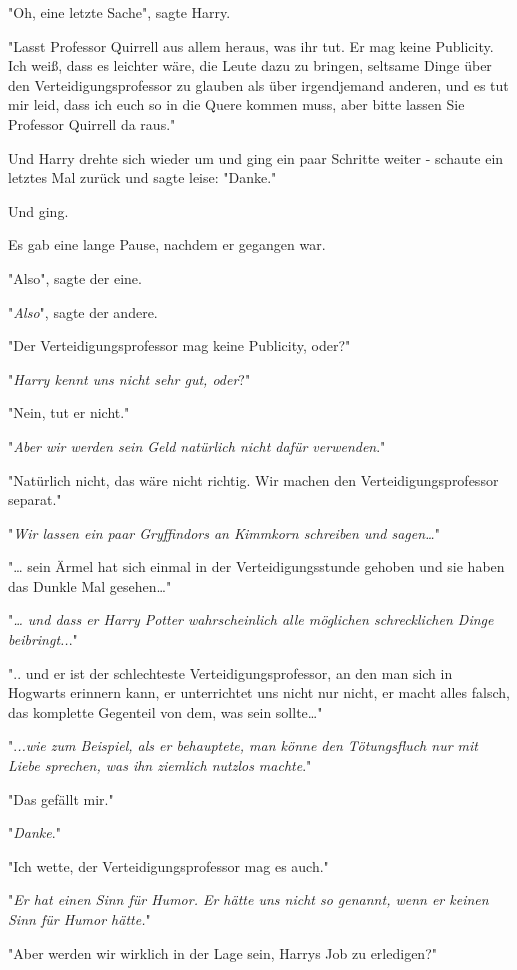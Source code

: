 {"Oh, eine letzte Sache", sagte Harry.

"Lasst Professor Quirrell aus allem heraus, was ihr tut. Er mag keine Publicity. Ich weiß, dass es leichter wäre, die Leute dazu zu bringen, seltsame Dinge über den Verteidigungsprofessor zu glauben als über irgendjemand anderen, und es tut mir leid, dass ich euch so in die Quere kommen muss, aber bitte lassen Sie Professor Quirrell da raus."

Und Harry drehte sich wieder um und ging ein paar Schritte weiter - schaute ein letztes Mal zurück und sagte leise: "Danke."

Und ging.

Es gab eine lange Pause, nachdem er gegangen war.

"Also", sagte der eine.

"\emph{Also}", sagte der andere.

"Der Verteidigungsprofessor mag keine Publicity, oder?"

"\emph{Harry kennt uns nicht sehr gut, oder}?"

"Nein, tut er nicht."

"\emph{Aber wir werden sein Geld natürlich nicht dafür verwenden}."

"Natürlich nicht, das wäre nicht richtig. Wir machen den Verteidigungsprofessor separat."

"\emph{Wir lassen ein paar Gryffindors an Kimmkorn schreiben und sagen…}"

"… sein Ärmel hat sich einmal in der Verteidigungsstunde gehoben und sie haben das Dunkle Mal gesehen…"

"\emph{… und dass er Harry Potter wahrscheinlich alle möglichen schrecklichen Dinge} \emph{beibringt..}."

".. und er ist der schlechteste Verteidigungsprofessor, an den man sich in Hogwarts erinnern kann, er unterrichtet uns nicht nur nicht, er macht alles falsch, das komplette Gegenteil von dem, was sein sollte…"

".\emph{..wie zum Beispiel, als er behauptete, man könne den Tötungsfluch nur mit Liebe sprechen, was ihn ziemlich nutzlos machte}."

"Das gefällt mir."

"\emph{Danke}."

"Ich wette, der Verteidigungsprofessor mag es auch."

"\emph{Er hat einen Sinn für Humor. Er hätte uns nicht so genannt, wenn er keinen Sinn für Humor hätte.}"

"Aber werden wir wirklich in der Lage sein, Harrys Job zu erledigen?"

}
